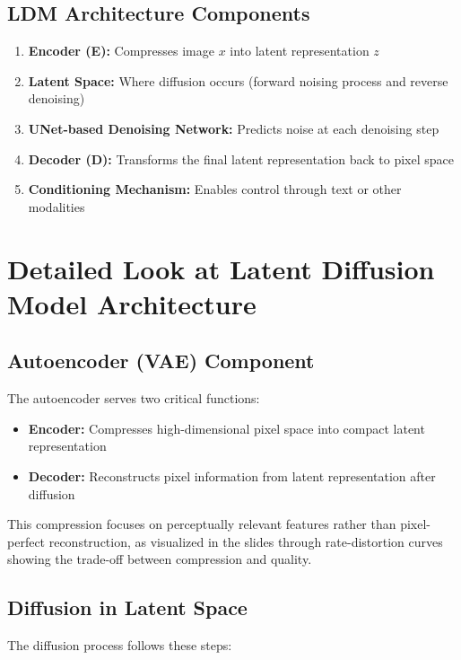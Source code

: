 \subsection*{LDM Architecture Components}
\begin{enumerate}
    \item \textbf{Encoder (E):} Compresses image $x$ into latent representation $z$
    \item \textbf{Latent Space:} Where diffusion occurs (forward noising process and reverse denoising)
    \item \textbf{UNet-based Denoising Network:} Predicts noise at each denoising step
    \item \textbf{Decoder (D):} Transforms the final latent representation back to pixel space
    \item \textbf{Conditioning Mechanism:} Enables control through text or other modalities
\end{enumerate}

\section{Detailed Look at Latent Diffusion Model Architecture}

\subsection*{Autoencoder (VAE) Component}
The autoencoder serves two critical functions:
\begin{itemize}
    \item \textbf{Encoder:} Compresses high-dimensional pixel space into compact latent representation
    \item \textbf{Decoder:} Reconstructs pixel information from latent representation after diffusion
\end{itemize}

This compression focuses on perceptually relevant features rather than pixel-perfect reconstruction, as visualized in the slides through rate-distortion curves showing the trade-off between compression and quality.

\subsection*{Diffusion in Latent Space}
The diffusion process follows these steps:

